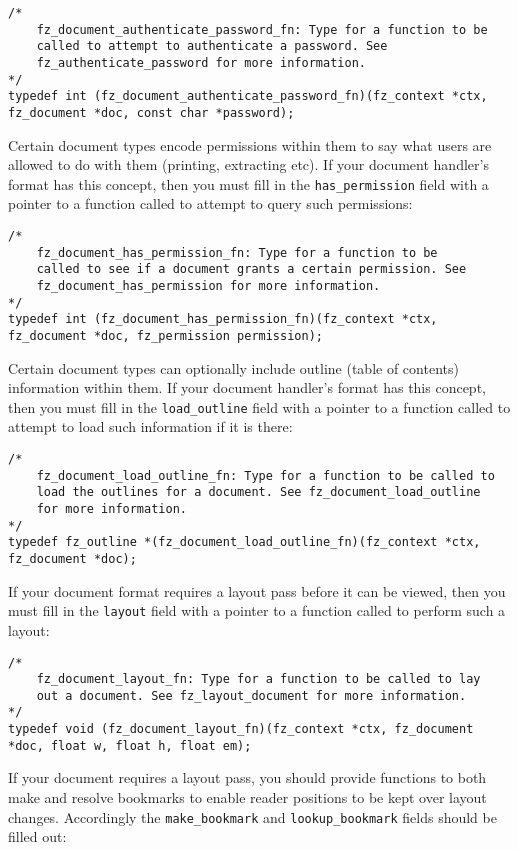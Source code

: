 \documentclass[oneside]{book}
\begin{document}
\begin{lstlisting}
/*
	fz_document_authenticate_password_fn: Type for a function to be
	called to attempt to authenticate a password. See
	fz_authenticate_password for more information.
*/
typedef int (fz_document_authenticate_password_fn)(fz_context *ctx, fz_document *doc, const char *password);
\end{lstlisting}

Certain document types encode permissions within them to say what users are allowed to do with them (printing, extracting etc). If your document handler's format has this concept, then you must fill in the \texttt{has\_permission} field with a pointer to a function called to attempt to query such permissions:

\begin{lstlisting}
/*
	fz_document_has_permission_fn: Type for a function to be
	called to see if a document grants a certain permission. See
	fz_document_has_permission for more information.
*/
typedef int (fz_document_has_permission_fn)(fz_context *ctx, fz_document *doc, fz_permission permission);
\end{lstlisting}

Certain document types can optionally include outline (table of contents) information within them. If your document handler's format has this concept, then you must fill in the \texttt{load\_outline} field with a pointer to a function called to attempt to load such information if it is there:

\begin{lstlisting}
/*
	fz_document_load_outline_fn: Type for a function to be called to
	load the outlines for a document. See fz_document_load_outline
	for more information.
*/
typedef fz_outline *(fz_document_load_outline_fn)(fz_context *ctx, fz_document *doc);
\end{lstlisting}

If your document format requires a layout pass before it can be viewed, then you must fill in the \texttt{layout} field with a pointer to a function called to perform such a layout:

\begin{lstlisting}
/*
	fz_document_layout_fn: Type for a function to be called to lay
	out a document. See fz_layout_document for more information.
*/
typedef void (fz_document_layout_fn)(fz_context *ctx, fz_document *doc, float w, float h, float em);
\end{lstlisting}

If your document requires a layout pass, you should provide functions to both make and resolve bookmarks to enable reader positions to be kept over layout changes. Accordingly the \texttt{make\_bookmark} and \texttt{lookup\_bookmark} fields should be filled out:
\end{document}
